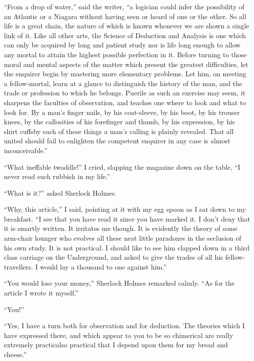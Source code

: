 \documentclass[12pt,english]{book}
\begin{document}
{}``From a drop of water,'' said the writer, {}``a logician could
infer the possibility of an Atlantic or a Niagara without having seen
or heard of one or the other. So all life is a great chain, the nature
of which is known whenever we are shown a single link of it. Like
all other arts, the Science of Deduction and Analysis is one which
can only be acquired by long and patient study nor is life long enough
to allow any mortal to attain the highest possible perfection in it.
Before turning to those moral and mental aspects of the matter which
present the greatest difficulties, let the enquirer begin by mastering
more elementary problems. Let him, on meeting a fellow-mortal, learn
at a glance to distinguish the history of the man, and the trade or
profession to which he belongs. Puerile as such an exercise may seem,
it sharpens the faculties of observation, and teaches one where to
look and what to look for. By a man's finger nails, by his coat-sleeve,
by his boot, by his trouser knees, by the callosities of his forefinger
and thumb, by his expression, by his shirt cuffs\mdsh{---}by each
of these things a man's calling is plainly revealed. That all united
should fail to enlighten the competent enquirer in any case is almost
inconceivable.''

{}``What ineffable twaddle!'' I cried, slapping the magazine down
on the table, {}``I never read such rubbish in my life.''

{}``What is it?'' asked Sherlock Holmes.

{}``Why, this article,'' I said, pointing at it with my egg spoon
as I sat down to my breakfast. {}``I see that you have read it since
you have marked it. I don't deny that it is smartly written. It irritates
me though. It is evidently the theory of some arm-chair lounger who
evolves all these neat little paradoxes in the seclusion of his own
study. It is not practical. I should like to see him clapped down
in a third class carriage on the Underground, and asked to give the
trades of all his fellow-travellers. I would lay a thousand to one
against him.''

{}``You would lose your money,'' Sherlock Holmes remarked calmly.
{}``As for the article I wrote it myself.''

{}``You!''

{}``Yes, I have a turn both for observation and for deduction. The
theories which I have expressed there, and which appear to you to
be so chimerical are really extremely practical\mdsh{---}so practical
that I depend upon them for my bread and cheese.''
\end{document}
